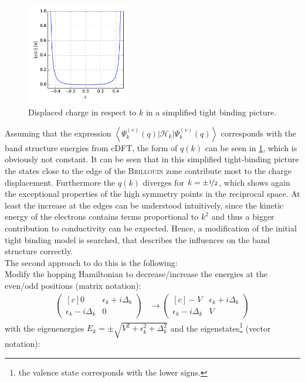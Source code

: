 \begin{figure}
	\centering
	\includegraphics[width = 0.4\textwidth]{Images/Hydrogen/charging/charge_vs_k}
	\caption{Displaced charge in respect to $k$ in a simplified tight binding picture.}
	\label{image_tight_binding_q_vs_k}
\end{figure}
Assuming that the expression $\left\langle\Psi_k^{(v)}(q)\Big|\mathcal{H}_{k}\Big|\Psi_k^{(v)}(q)\right\rangle$ corresponds with the band structure energies from cDFT, the form of $q(k)$ can be seen in \cref{image_tight_binding_q_vs_k}, which is obviously not constant. It can be seen that in this simplified tight-binding picture the states close to the edge of the \textsc{Brillouin} zone contribute most to the charge displacement. Furthermore the $q(k)$ diverges for $k = \pm \nicefrac{1}{2}$, which shows again the exceptional properties of the high symmetry points in the reciprocal space. At least the increase at the edges can be understood intuitively, since the kinetic energy of the electrons contains terms proportional to $k^2$ and thus a bigger contribution to conductivity can be expected. Hence, a modification of the initial tight binding model is searched, that describes the influences on the band structure correctly.\\
The second approach to do this is the following:\\
Modify the hopping Hamiltonian to decrease/increase the energies at the even/odd positions (matrix notation):
\begin{align}
\begin{pmatrix*}[c]
0 & \epsilon_k + i \Delta_k \\
\epsilon_k - i \Delta_k & 0
\end{pmatrix*} 
&\to 
\begin{pmatrix*}[c]
-V & \epsilon_k + i \Delta_k \\
\epsilon_k - i \Delta_k & V
\end{pmatrix*}
\end{align}
with the eigenenergies $E_k = \pm \sqrt{V^2+\epsilon_k^2+\Delta_k^2}$ and the eigenstates\footnote{the valence state corresponds with the lower signs.} (vector notation):

